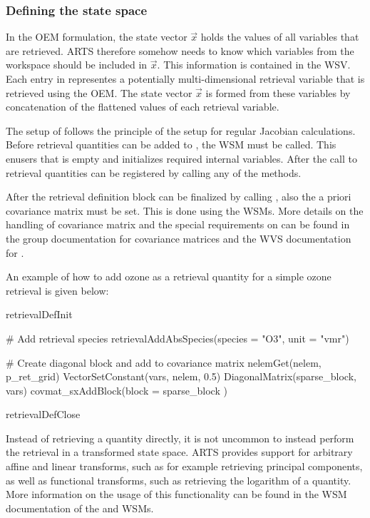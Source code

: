 \subsubsection{Defining the state space}

In the OEM formulation, the state vector $\vec{x}$ holds the values of all variables
that are retrieved.  ARTS therefore somehow needs to know which variables from
the workspace should be included in  $\vec{x}$. This information is contained in the
 WSV. Each entry in 
representes a potentially multi-dimensional retrieval variable that is retrieved
using the OEM. The state vector $\vec{x}$ is formed from these variables by concatenation
of the flattened values of each retrieval variable.

The setup of  follows the principle of the setup for
regular Jacobian calculations. Before retrieval quantities can be added to
, the  WSM must be called.
This enusers that  is empty and initializes required
internal variables. After the call to  retrieval
quantities can be registered by calling any of the 
 methods.

After the retrieval definition block can be finalized by calling 
, also the a priori covariance matrix
  must be set. This is done using the
 WSMs. More details on the handling of
covariance matrix and the special requirements on 
can be found in the group documentation for covariance matrices and
the WVS documentation for .

An example of how to add ozone as a retrieval quantity for a simple ozone
retrieval is given below:

\begin{code}
retrievalDefInit

# Add retrieval species
retrievalAddAbsSpecies(species = "O3", unit = "vmr")

# Create diagonal block and add to covariance matrix
nelemGet(nelem, p_ret_grid)
VectorSetConstant(vars, nelem, 0.5)
DiagonalMatrix(sparse_block, vars)
covmat_sxAddBlock(block = sparse_block )

retrievalDefClose
\end{code}

Instead of retrieving a quantity directly, it is not uncommon
to instead perform the retrieval in a transformed state space. ARTS
provides support for arbitrary affine and linear transforms, such
as for example retrieving principal components, as well as functional
transforms, such as retrieving the logarithm of a quantity. More
information on the usage of this functionality can be found in the
WSM documentation of the 
and  WSMs.

